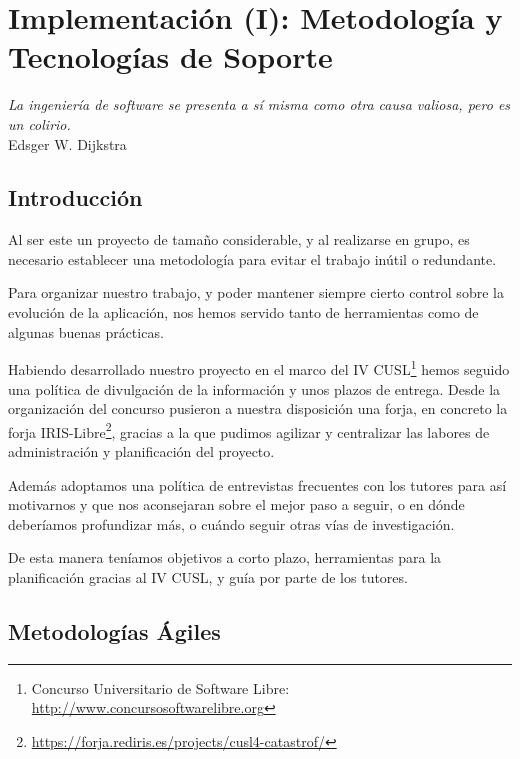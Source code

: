 \chapter{Implementación (I): Metodología y Tecnologías de Soporte}
\label{cap5a}

\begin{flushright}
\begin{minipage}{7.85cm}
    {\em La ingeniería de software se presenta a sí misma como otra causa
    valiosa, pero es un colirio.} \\ Edsger W. Dijkstra
\end{minipage}
\end{flushright}

\vspace*{5mm}

\section{Introducción}

Al ser este un proyecto de tamaño considerable, y al realizarse en grupo, es
necesario establecer una metodología para evitar el trabajo inútil o redundante.

Para organizar nuestro trabajo, y poder mantener siempre cierto control sobre la
evolución de la aplicación, nos hemos servido tanto de herramientas como de
algunas buenas prácticas.

Habiendo desarrollado nuestro proyecto en el marco del IV CUSL\footnote{Concurso
Universitario de Software Libre: \url{http://www.concursosoftwarelibre.org}}
hemos seguido una política de divulgación de la información y unos plazos de
entrega. Desde la organización del concurso pusieron a nuestra disposición una
forja, en concreto la forja
IRIS-Libre\footnote{\url{https://forja.rediris.es/projects/cusl4-catastrof/}},
gracias a la que pudimos agilizar y centralizar las labores de administración y
planificación del proyecto.

Además adoptamos una política de entrevistas frecuentes con los tutores para
así motivarnos y que nos aconsejaran sobre el mejor paso a seguir, o en dónde
deberíamos profundizar más, o cuándo seguir otras vías de investigación.

De esta manera teníamos objetivos a corto plazo, herramientas para la
planificación gracias al IV CUSL, y guía por parte de los tutores.

\section{Metodologías Ágiles}

